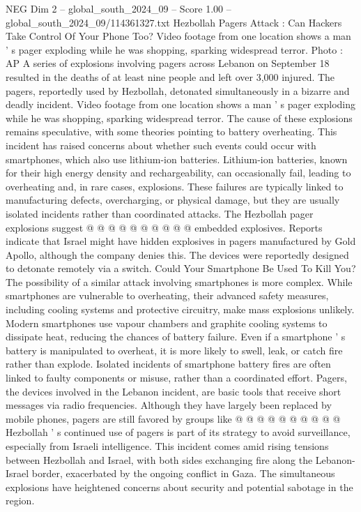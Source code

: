 \begin{textsample}{NEG Dim 2 – global\_south\_2024\_09 – Score 1.00 – global\_south\_2024\_09/114361327.txt}  \label{ex:f2_neg_257}
Hezbollah Pagers Attack : Can Hackers Take Control Of Your Phone Too?
Video footage from one location shows a man ' s pager exploding while he was shopping, sparking widespread terror.
Photo : AP A series of explosions involving pagers across Lebanon on September 18 resulted in the deaths of at least nine people and left over 3,000 injured.
The pagers, reportedly used by Hezbollah, detonated simultaneously in a bizarre and deadly incident.
Video footage from one location shows a man ' s pager exploding while he was shopping, sparking widespread terror.
The cause of these explosions remains speculative, with some theories pointing to battery overheating.
This incident has raised concerns about whether such events could occur with smartphones, which also use lithium-ion batteries.
Lithium-ion batteries, known for their high energy density and rechargeability, can occasionally fail, leading to overheating and, in rare cases, explosions.
These failures are typically linked to manufacturing defects, overcharging, or physical damage, but they are usually isolated incidents rather than coordinated attacks.
The Hezbollah pager explosions suggest @ @ @ @ @ @ @ @ @ @ embedded explosives.
Reports indicate that Israel might have hidden explosives in pagers manufactured by Gold Apollo, although the company denies this.
The devices were reportedly designed to detonate remotely via a switch.
Could Your Smartphone Be Used To Kill You?
The possibility of a similar attack involving smartphones is more complex.
While smartphones are vulnerable to overheating, their advanced safety measures, including cooling systems and protective circuitry, make mass explosions unlikely.
Modern smartphones use vapour chambers and graphite cooling systems to dissipate heat, reducing the chances of battery failure.
Even if a smartphone ' s battery is manipulated to overheat, it is more likely to swell, leak, or catch fire rather than explode.
Isolated incidents of smartphone battery fires are often linked to faulty components or misuse, rather than a coordinated effort.
Pagers, the devices involved in the Lebanon incident, are basic tools that receive short messages via radio frequencies.
Although they have largely been replaced by mobile phones, pagers are still favored by groups like @ @ @ @ @ @ @ @ @ @ Hezbollah ' s continued use of pagers is part of its strategy to avoid surveillance, especially from Israeli intelligence.
This incident comes amid rising tensions between Hezbollah and Israel, with both sides exchanging fire along the Lebanon-Israel border, exacerbated by the ongoing conflict in Gaza.
The simultaneous explosions have heightened concerns about security and potential sabotage in the region.

\end{textsample}
